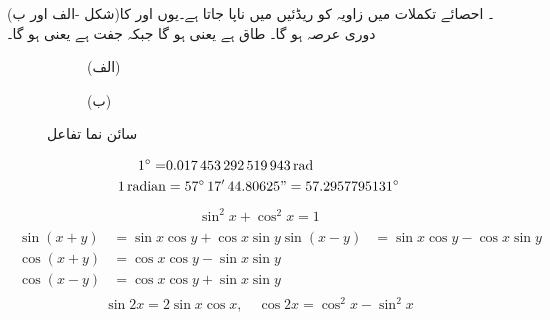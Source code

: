  (شکل -الف اور ب)۔ احصائے تکملات میں زاویہ کو ریڈئیں میں ناپا جاتا ہے۔یوں  اور  کا دوری عرصہ  ہو گا۔ طاق ہے یعنی  ہو گا جبکہ  جفت ہے یعنی  ہو گا۔
\begin{figure}
\centering
\begin{subfigure}{0.5\textwidth}
\centering
{}
\caption*{(الف) }
\end{subfigure}%
\begin{subfigure}{0.5\textwidth}
\centering
{}
\caption*{(ب) }
\end{subfigure}%
\caption{سائن نما تفاعل}
\label{شکل_ضمیمہ_مفید_سائن_نما}
\end{figure}
%
\begin{align*}
1^{\circ}=&\SI{0.017453292519943}{\radian}\\
\SI{1}{radian}&=57^\circ\,17'\,44.80625"=57.2957795131^{\circ}
\end{align*}
%
\begin{align}
\sin^2x+\cos^2x=1
\end{align}
%
\begin{gather}
\begin{aligned}\label{مساوات_ضمیمہ_مفید_چھ}
\sin(x+y)&=\sin x\cos y+\cos x\sin y
\sin(x-y)&=\sin x\cos y-\cos x\sin y\\
\cos(x+y)&=\cos x\cos y-\sin x\sin y\\
\cos(x-y)&=\cos x\cos y+\sin x\sin y
\end{aligned}
\end{gather}
%
\begin{align}
\sin 2x=2\sin x\cos x, \quad \cos 2x=\cos^2x-\sin^2x
\end{align}
